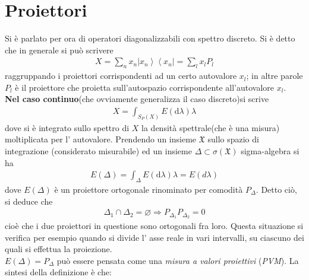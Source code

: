 \section{Proiettori} %
Si è parlato per ora di operatori diagonalizzabili con spettro discreto.
Si è detto che in generale si può scrivere
 \begin{equation}\begin{split}
X=\sum_{n}x_n\left |x_n \right\rangle\left\langle x_n\right |=\sum_{l}x_lP_l
 \end{split}\end{equation}
raggruppando i proiettori corrispondenti ad un certo autovalore $x_l$; in altre parole $P_l$ è il proiettore che proietta sull'autospazio corrispondente all'autovalore $x_l$.\\
\textbf{Nel caso continuo}(che ovviamente generalizza il caso discreto)si scrive
 \begin{equation}\begin{split}
X=\int_{S_P\left(X\right)}{E\left(\textrm{d}\lambda\right)\lambda}
 \end{split}\end{equation}
dove si è integrato sullo spettro di $X$ la densità spettrale(che è una misura) moltiplicata per l' autovalore.
Prendendo un insieme $\mathfrak{X}$ sullo spazio di integrazione (considerato misurabile) ed un insieme $\Delta \subset \sigma\left(\mathfrak{X}\right)$ sigma-algebra si ha
 \begin{equation}\begin{split}
E\left(\Delta\right)=\int_{\Delta}{E\left(\textrm{d}\lambda\right)\lambda}=E\left(d\lambda\right)
 \end{split}\end{equation}
dove $E\left(\Delta\right)$ è un proiettore ortogonale rinominato per comodità $P_\Delta$.
Detto ciò, si deduce che
 \begin{equation}\begin{split}
\Delta_1\cap \Delta_2=\varnothing\Longrightarrow P_{\Delta_1}P_{\Delta_2}=0
 \end{split}\end{equation}
cioè che i due proiettori in questione sono ortogonali fra loro. Questa situazione si verifica per esempio quando si divide l' asse reale in vari intervalli, su ciascuno dei quali si effettua la proiezione.\\
$E\left(\Delta\right)=P_\Delta$ può essere pensata come una \textit{misura a valori proiettivi} (\emph{\textit{PVM}}).
La sintesi della definizione è che:

